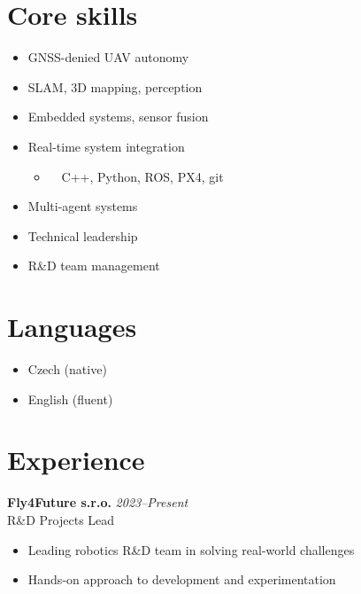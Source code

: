 \documentclass[12pt,a4paper]{article}
\begin{document}
\begin{paracol}{2}
\section*{Core skills}
\begin{itemize}
\item GNSS-denied UAV autonomy
\item SLAM, 3D mapping, perception
\item Embedded systems, sensor fusion
\item Real-time system integration
  \begin{itemize}
    \item ~~C++, Python, ROS, PX4, git
  \end{itemize}
\item Multi-agent systems
\item Technical leadership
\item R\&D team management
\end{itemize}

\vspace{0.2em}
\section*{Languages}
\begin{itemize}
\item Czech (native)
\item English (fluent)
\end{itemize}

\switchcolumn

\color{primary}

\vspace{-0.3cm}
\section*{Experience}

\textbf{Fly4Future s.r.o.} \hfill \textit{2023–Present} \\
R\&D Projects Lead
\begin{itemize}
  \item Leading robotics R\&D team in solving real-world challenges
  \item Hands-on approach to development and experimentation
\end{itemize}


\end{paracol}
\end{document}

